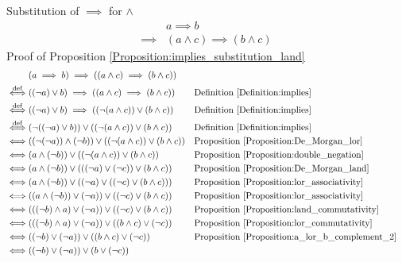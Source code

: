 \begin{prop}
\label{Proposition:implies_substitution_land}
Substitution of $\implies$ for $\land$
\begin{align*}
& a \implies b \\
\implies & (a \land c) \implies (b \land c)
\end{align*}
Proof of Proposition \ref{Proposition:implies_substitution_land}
\begin{align*}
& (a \implies b) \implies ((a \land c) \implies (b \land c)) \\
\overset{\operatorname{def}}{\iff} & ((\lnot a) \lor b) \implies ((a \land c) \implies (b \land c))
& & \text{Definition \ref{Definition:implies}} \\
\overset{\operatorname{def}}{\iff} & ((\lnot a) \lor b) \implies ((\lnot (a \land c)) \lor (b \land c))
& & \text{Definition \ref{Definition:implies}} \\
\overset{\operatorname{def}}{\iff} & (\lnot ((\lnot a) \lor b)) \lor ((\lnot (a \land c)) \lor (b \land c))
& & \text{Definition \ref{Definition:implies}} \\
\iff & ((\lnot (\lnot a)) \land (\lnot b)) \lor ((\lnot (a \land c)) \lor (b \land c))
& & \text{Proposition \ref{Proposition:De_Morgan_lor}} \\
\iff & (a \land (\lnot b)) \lor ((\lnot (a \land c)) \lor (b \land c))
& & \text{Proposition \ref{Proposition:double_negation}} \\
\iff & (a \land (\lnot b)) \lor (((\lnot a) \lor (\lnot c)) \lor (b \land c))
& & \text{Proposition \ref{Proposition:De_Morgan_land}} \\
\iff & (a \land (\lnot b)) \lor ((\lnot a) \lor ((\lnot c) \lor (b \land c)))
& & \text{Proposition \ref{Proposition:lor_associativity}} \\
\iff & ((a \land (\lnot b)) \lor (\lnot a)) \lor ((\lnot c) \lor (b \land c))
& & \text{Proposition \ref{Proposition:lor_associativity}} \\
\iff & (((\lnot b) \land a) \lor (\lnot a)) \lor ((\lnot c) \lor (b \land c))
& & \text{Proposition \ref{Proposition:land_commutativity}} \\
\iff & (((\lnot b) \land a) \lor (\lnot a)) \lor ((b \land c) \lor (\lnot c))
& & \text{Proposition \ref{Proposition:lor_commutativity}} \\
\iff & ((\lnot b) \lor (\lnot a)) \lor ((b \land c) \lor (\lnot c))
& & \text{Proposition \ref{Proposition:a_lor_b_complement_2}} \\
\iff & ((\lnot b) \lor (\lnot a)) \lor (b \lor (\lnot c))

\end{align*}
\end{prop}
